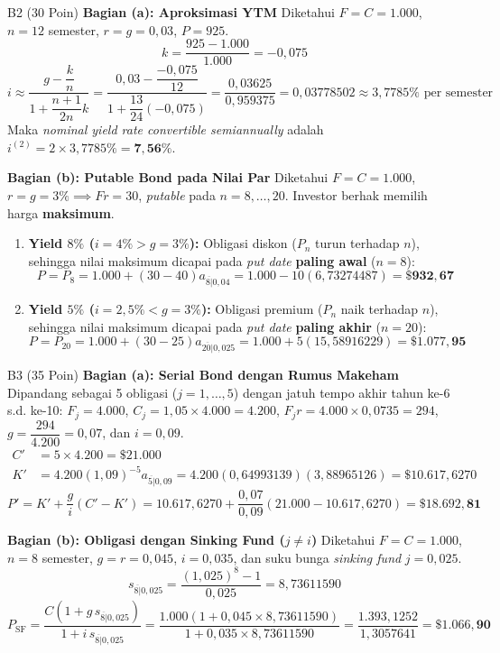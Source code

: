 \documentclass[11pt,a4paper]{article}
\newcommand{\angl}[1]{\overline{#1|}}
\begin{document}
\begin{solusibox}{B2 (30 Poin)}
\textbf{Bagian (a): Aproksimasi YTM}
Diketahui $F = C = 1.000$, $n = 12$ semester, $r = g = 0{,}03$, $P = 925$.
\[
    k = \frac{925 - 1.000}{1.000} = -0{,}075
\]
\[
    i \approx \frac{g - \dfrac{k}{n}}{1 + \dfrac{n+1}{2n}k} = \frac{0{,}03 - \dfrac{-0{,}075}{12}}{1 + \dfrac{13}{24}(-0{,}075)} = \frac{0{,}03625}{0{,}959375} = 0{,}03778502 \approx 3{,}7785\% \text{ per semester}
\]
Maka \textit{nominal yield rate convertible semiannually} adalah $i^{(2)} = 2 \times 3{,}7785\% = \mathbf{7{,}56\%}$.

\textbf{Bagian (b): Putable Bond pada Nilai Par}
Diketahui $F = C = 1.000$, $r = g = 3\% \implies Fr = 30$, \textit{putable} pada $n = 8, \dots, 20$. Investor berhak memilih harga \textbf{maksimum}.
\begin{enumerate}[label=(\roman*), leftmargin=6mm, topsep=1pt, itemsep=1pt]
    \item \textbf{Yield $8\%$ ($i = 4\% > g = 3\%$):} Obligasi diskon ($P_n$ turun terhadap $n$), sehingga nilai maksimum dicapai pada \textit{put date} \textbf{paling awal} ($n = 8$):
    \[
        P = P_8 = 1.000 + (30 - 40)a_{\angl{8}0{,}04} = 1.000 - 10(6{,}73274487) = \mathbf{\$932{,}67}
    \]
    \item \textbf{Yield $5\%$ ($i = 2{,}5\% < g = 3\%$):} Obligasi premium ($P_n$ naik terhadap $n$), sehingga nilai maksimum dicapai pada \textit{put date} \textbf{paling akhir} ($n = 20$):
    \[
        P = P_{20} = 1.000 + (30 - 25)a_{\angl{20}0{,}025} = 1.000 + 5(15{,}58916229) = \mathbf{\$1.077{,}95}
    \]
\end{enumerate}
\end{solusibox}

\begin{solusibox}{B3 (35 Poin)}
\textbf{Bagian (a): Serial Bond dengan Rumus Makeham}
Dipandang sebagai 5 obligasi ($j = 1, \dots, 5$) dengan jatuh tempo akhir tahun ke-6 s.d. ke-10:
$F_j = 4.000$, $C_j = 1{,}05 \times 4.000 = 4.200$, $F_j r = 4.000 \times 0{,}0735 = 294$, $g = \dfrac{294}{4.200} = 0{,}07$, dan $i = 0{,}09$.
\begin{align*}
    C' &= 5 \times 4.200 = \$21.000 \\
    K' &= 4.200(1{,}09)^{-5} a_{\angl{5}0{,}09} = 4.200(0{,}64993139)(3{,}88965126) = \$10.617{,}6270
\end{align*}
\[
    P' = K' + \frac{g}{i}(C' - K') = 10.617{,}6270 + \frac{0{,}07}{0{,}09}(21.000 - 10.617{,}6270) = \mathbf{\$18.692{,}81}
\]

\textbf{Bagian (b): Obligasi dengan Sinking Fund ($j \neq i$)}
Diketahui $F = C = 1.000$, $n = 8$ semester, $g = r = 0{,}045$, $i = 0{,}035$, dan suku bunga \textit{sinking fund} $j = 0{,}025$.
\[
    s_{\angl{8}0{,}025} = \frac{(1{,}025)^8 - 1}{0{,}025} = 8{,}73611590
\]
\[
    P_{\text{SF}} = \frac{C(1 + g \, s_{\angl{8}0{,}025})}{1 + i \, s_{\angl{8}0{,}025}} = \frac{1.000(1 + 0{,}045 \times 8{,}73611590)}{1 + 0{,}035 \times 8{,}73611590} = \frac{1.393{,}1252}{1{,}3057641} = \mathbf{\$1.066{,}90}
\]
\end{solusibox}
\end{document}
